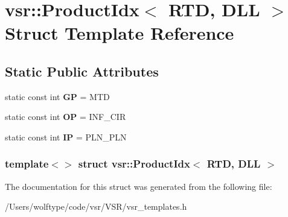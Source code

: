 \hypertarget{structvsr_1_1_product_idx_3_01_r_t_d_00_01_d_l_l_01_4}{\section{vsr\-:\-:Product\-Idx$<$ R\-T\-D, D\-L\-L $>$ Struct Template Reference}
\label{structvsr_1_1_product_idx_3_01_r_t_d_00_01_d_l_l_01_4}
}
\subsection*{Static Public Attributes}
\begin{DoxyCompactItemize}
\item 
\hypertarget{structvsr_1_1_product_idx_3_01_r_t_d_00_01_d_l_l_01_4_ae0d7da3281c970f2cfc45625526c725b}{static const int {\bfseries G\-P} = M\-T\-D}\label{structvsr_1_1_product_idx_3_01_r_t_d_00_01_d_l_l_01_4_ae0d7da3281c970f2cfc45625526c725b}

\item 
\hypertarget{structvsr_1_1_product_idx_3_01_r_t_d_00_01_d_l_l_01_4_ae65933d7cfd4f4ec2ba315a94daa22ac}{static const int {\bfseries O\-P} = I\-N\-F\-\_\-\-C\-I\-R}\label{structvsr_1_1_product_idx_3_01_r_t_d_00_01_d_l_l_01_4_ae65933d7cfd4f4ec2ba315a94daa22ac}

\item 
\hypertarget{structvsr_1_1_product_idx_3_01_r_t_d_00_01_d_l_l_01_4_a31391d0378c14231a077356e6345502b}{static const int {\bfseries I\-P} = P\-L\-N\-\_\-\-P\-L\-N}\label{structvsr_1_1_product_idx_3_01_r_t_d_00_01_d_l_l_01_4_a31391d0378c14231a077356e6345502b}

\end{DoxyCompactItemize}
\subsubsection*{template$<$$>$ struct vsr\-::\-Product\-Idx$<$ R\-T\-D, D\-L\-L $>$}



The documentation for this struct was generated from the following file\-:\begin{DoxyCompactItemize}
\item 
/\-Users/wolftype/code/vsr/\-V\-S\-R/vsr\-\_\-templates.\-h\end{DoxyCompactItemize}
